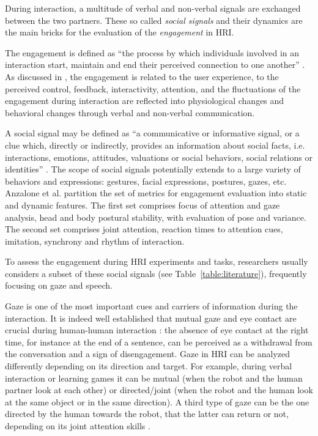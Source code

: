 During interaction, a multitude of verbal and non-verbal signals are exchanged between the two partners. These so called \textit{social signals}  and their dynamics are the main bricks for the evaluation of the \textit{engagement} in HRI.

The engagement is defined as ``the process by which individuals involved in an interaction start, maintain and end their perceived connection to one another'' \cite{sidner2005}. As discussed in \cite{Anzalone2015engagement}, the engagement is related to the user experience, to the perceived control, feedback, interactivity, attention, and the fluctuations of the engagement during interaction are reflected into physiological changes and behavioral changes through verbal and non-verbal communication.

A social signal may be defined as ``a communicative or informative signal, or a clue which, directly or indirectly, provides an information about social facts, i.e. interactions, emotions, attitudes, valuations or social behaviors, social relations or identities'' \cite{Poggi2012}. The scope of social signals potentially extends to a large variety of behaviors and expressions: gestures, facial expressions, postures, gazes, etc. 
Anzalone et al. \cite{Anzalone2015engagement} partition the set of metrics for engagement evaluation into static and dynamic features. The first set comprises focus of attention and gaze analysis, head and body postural stability, with evaluation of pose and variance. The second set comprises joint attention, reaction times to attention cues, imitation, synchrony and rhythm of interaction. 

To assess the engagement during HRI experiments and tasks, researchers usually considers a subset of these social signals (see Table~\ref{table:literature}), frequently focusing on gaze and speech.


Gaze is one of the most important cues and carriers of information during the interaction.
It is indeed well established that mutual gaze and eye contact are crucial during human-human interaction \cite{Goffman1967}: the absence of eye contact at the right time, for instance at the end of a sentence, can be perceived as a withdrawal from the conversation and a sign of disengagement. 
Gaze in HRI can be analyzed differently depending on its direction and target.
For example, during verbal interaction \cite{rich2010recognizing,Iishi2011} or learning games \cite{ivaldi2014frontiers} it can be mutual (when the robot and the human partner look at each other) or directed/joint (when the robot and the human look at the same object or in the same direction).  
A third type of gaze can be the one directed by the human towards the robot, that the latter can return or not, depending on its joint attention skills \cite{sidner2004}.
 
